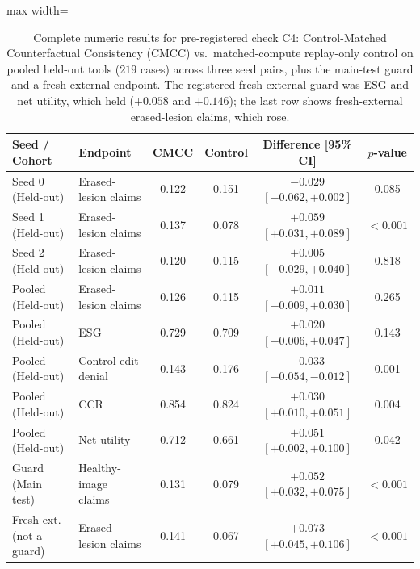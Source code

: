 \documentclass[5p,times,twocolumn,authoryear]{elsarticle}
\begin{document}
\begin{table}[!htbp]
\caption{Complete numeric results for pre-registered check C4: Control-Matched Counterfactual Consistency (CMCC) vs.\ matched-compute replay-only control on pooled held-out tools ($219$ cases) across three seed pairs, plus the main-test guard and a fresh-external endpoint. The registered fresh-external guard was ESG and net utility, which held ($+0.058$ and $+0.146$); the last row shows fresh-external erased-lesion claims, which rose.}
\label{tab:app_c4_cmcc}
\begin{center}
\small
\begin{adjustbox}{max width=\linewidth}
\begin{tabular}{llcccc}
\toprule
\textbf{Seed / Cohort} & \textbf{Endpoint} & \textbf{CMCC} & \textbf{Control} & \textbf{Difference [95\% CI]} & \textbf{$p$-value} \\
\midrule
Seed 0 (Held-out) & Erased-lesion claims & 0.122 & 0.151 & $-0.029$ $[-0.062, +0.002]$ & 0.085 \\
Seed 1 (Held-out) & Erased-lesion claims & 0.137 & 0.078 & $+0.059$ $[+0.031, +0.089]$ & $<0.001$ \\
Seed 2 (Held-out) & Erased-lesion claims & 0.120 & 0.115 & $+0.005$ $[-0.029, +0.040]$ & 0.818 \\
\midrule
Pooled (Held-out) & Erased-lesion claims & 0.126 & 0.115 & $+0.011$ $[-0.009, +0.030]$ & 0.265 \\
Pooled (Held-out) & ESG & 0.729 & 0.709 & $+0.020$ $[-0.006, +0.047]$ & 0.143 \\
Pooled (Held-out) & Control-edit denial & 0.143 & 0.176 & $-0.033$ $[-0.054, -0.012]$ & 0.001 \\
Pooled (Held-out) & CCR & 0.854 & 0.824 & $+0.030$ $[+0.010, +0.051]$ & 0.004 \\
Pooled (Held-out) & Net utility & 0.712 & 0.661 & $+0.051$ $[+0.002, +0.100]$ & 0.042 \\
\midrule
Guard (Main test) & Healthy-image claims & 0.131 & 0.079 & $+0.052$ $[+0.032, +0.075]$ & $<0.001$ \\
Fresh ext. (not a guard) & Erased-lesion claims & 0.141 & 0.067 & $+0.073$ $[+0.045, +0.106]$ & $<0.001$ \\
\bottomrule
\end{tabular}
\end{adjustbox}
\end{center}
\end{table}
\end{document}
